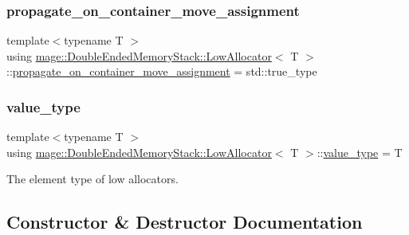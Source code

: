 \subsubsection{\texorpdfstring{propagate\+\_\+on\+\_\+container\+\_\+move\+\_\+assignment}{propagate\_on\_container\_move\_assignment}}
{\footnotesize\ttfamily template$<$typename T $>$ \\
using \mbox{\hyperlink{classmage_1_1_double_ended_memory_stack_1_1_low_allocator}{mage\+::\+Double\+Ended\+Memory\+Stack\+::\+Low\+Allocator}}$<$ T $>$\+::\mbox{\hyperlink{classmage_1_1_double_ended_memory_stack_1_1_low_allocator_ae864e2014f35dc1165e84de06018364b}{propagate\+\_\+on\+\_\+container\+\_\+move\+\_\+assignment}} =  std\+::true\+\_\+type}

\mbox{\label{classmage_1_1_double_ended_memory_stack_1_1_low_allocator_a38357d7dde55731d76644c13e64b03a6}} 
\subsubsection{\texorpdfstring{value\+\_\+type}{value\_type}}
{\footnotesize\ttfamily template$<$typename T $>$ \\
using \mbox{\hyperlink{classmage_1_1_double_ended_memory_stack_1_1_low_allocator}{mage\+::\+Double\+Ended\+Memory\+Stack\+::\+Low\+Allocator}}$<$ T $>$\+::\mbox{\hyperlink{classmage_1_1_double_ended_memory_stack_1_1_low_allocator_a38357d7dde55731d76644c13e64b03a6}{value\+\_\+type}} =  T}

The element type of low allocators. 

\subsection{Constructor \& Destructor Documentation}
\mbox{\label{classmage_1_1_double_ended_memory_stack_1_1_low_allocator_aae78b9e9c97d6a4dbd234cfb52d4059d}} 
